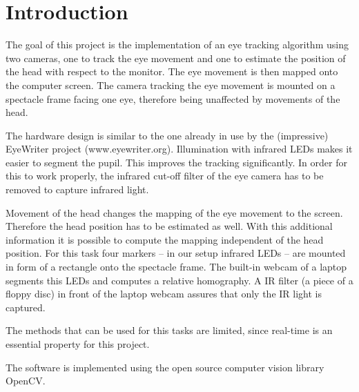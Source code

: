 \section{Introduction}\label{introduction}

The goal of this project is the implementation of an eye tracking algorithm using two cameras, one to track the eye movement and one to estimate the position of the head with respect to the monitor. 
The eye movement is then mapped onto the computer screen. 
The camera tracking the eye movement is mounted on a spectacle frame facing one eye, therefore being unaffected by movements of the head. 

The hardware design is similar to the one already in use by the (impressive) EyeWriter project (www.eyewriter.org). 
Illumination with infrared LEDs makes it easier to segment the pupil. This improves the tracking significantly. 
In order for this to work properly, the infrared cut-off filter of the eye camera has to be removed to capture infrared light. 

Movement of the head changes the mapping of the eye movement to the screen. Therefore the head position has to be estimated as well.
With this additional information it is possible to compute the mapping independent of the head position. 
For this task four markers -- in our setup infrared LEDs -- are mounted in form of a rectangle onto the spectacle frame. 
The built-in webcam of a laptop segments this LEDs and computes a relative homography. 
A IR filter (a piece of a floppy disc) in front of the laptop webcam assures that only the IR light is captured. 

The methods that can be used for this tasks are limited, since real-time is an essential property for this project.

The software is implemented using the open source computer vision library OpenCV.
